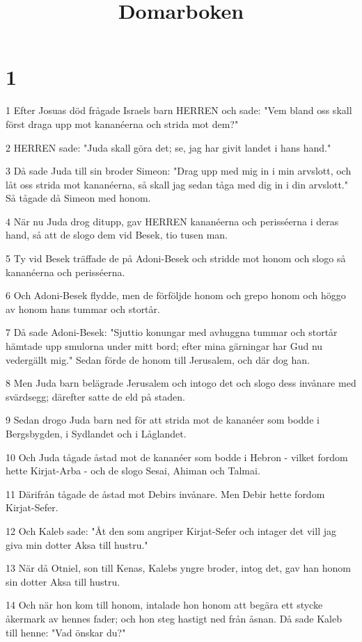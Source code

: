 

\title{Domarboken}


\chapter{1}

\par 1 Efter Josuas död frågade Israels barn HERREN och sade: "Vem bland oss skall först draga upp mot kananéerna och strida mot dem?"
\par 2 HERREN sade: "Juda skall göra det; se, jag har givit landet i hans hand."
\par 3 Då sade Juda till sin broder Simeon: "Drag upp med mig in i min arvslott, och låt oss strida mot kananéerna, så skall jag sedan tåga med dig in i din arvslott." Så tågade då Simeon med honom.
\par 4 När nu Juda drog ditupp, gav HERREN kananéerna och perisséerna i deras hand, så att de slogo dem vid Besek, tio tusen man.
\par 5 Ty vid Besek träffade de på Adoni-Besek och stridde mot honom och slogo så kananéerna och perisséerna.
\par 6 Och Adoni-Besek flydde, men de förföljde honom och grepo honom och höggo av honom hans tummar och stortår.
\par 7 Då sade Adoni-Besek: "Sjuttio konungar med avhuggna tummar och stortår hämtade upp smulorna under mitt bord; efter mina gärningar har Gud nu vedergällt mig." Sedan förde de honom till Jerusalem, och där dog han.
\par 8 Men Juda barn belägrade Jerusalem och intogo det och slogo dess invånare med svärdsegg; därefter satte de eld på staden.
\par 9 Sedan drogo Juda barn ned för att strida mot de kananéer som bodde i Bergsbygden, i Sydlandet och i Låglandet.
\par 10 Och Juda tågade åstad mot de kananéer som bodde i Hebron - vilket fordom hette Kirjat-Arba - och de slogo Sesai, Ahiman och Talmai.
\par 11 Därifrån tågade de åstad mot Debirs invånare. Men Debir hette fordom Kirjat-Sefer.
\par 12 Och Kaleb sade: "Åt den som angriper Kirjat-Sefer och intager det vill jag giva min dotter Aksa till hustru."
\par 13 När då Otniel, son till Kenas, Kalebs yngre broder, intog det, gav han honom sin dotter Aksa till hustru.
\par 14 Och när hon kom till honom, intalade hon honom att begära ett stycke åkermark av hennes fader; och hon steg hastigt ned från åsnan. Då sade Kaleb till henne: "Vad önskar du?"

